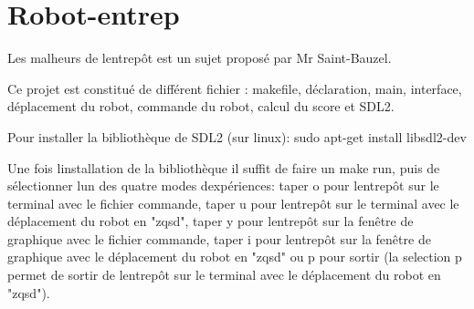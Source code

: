 \chapter{Robot-\/entrep}
\hypertarget{md_README}{}\label{md_README}
\label{md_README_autotoc_md0}%
%
 Les malheurs de l\textquotesingle{}entrepôt est un sujet proposé par Mr Saint-\/\+Bauzel.

Ce projet est constitué de différent fichier \+: makefile, déclaration, main, interface, déplacement du robot, commande du robot, calcul du score et SDL2.

Pour installer la bibliothèque de SDL2 (sur linux)\+: sudo apt-\/get install libsdl2-\/dev

Une fois l\textquotesingle{}installation de la bibliothèque il suffit de faire un make run, puis de sélectionner l\textquotesingle{}un des quatre modes d\textquotesingle{}expériences\+: taper \textquotesingle{}o\textquotesingle{} pour l\textquotesingle{}entrepôt sur le terminal avec le fichier commande, taper \textquotesingle{}u\textquotesingle{} pour l\textquotesingle{}entrepôt sur le terminal avec le déplacement du robot en "{}zqsd"{}, taper \textquotesingle{}y\textquotesingle{} pour l\textquotesingle{}entrepôt sur la fenêtre de graphique avec le fichier commande, taper \textquotesingle{}i\textquotesingle{} pour l\textquotesingle{}entrepôt sur la fenêtre de graphique avec le déplacement du robot en "{}zqsd"{} ou \textquotesingle{}p\textquotesingle{} pour sortir (la selection \textquotesingle{}p\textquotesingle{} permet de sortir de l\textquotesingle{}entrepôt sur le terminal avec le déplacement du robot en "{}zqsd"{}). 